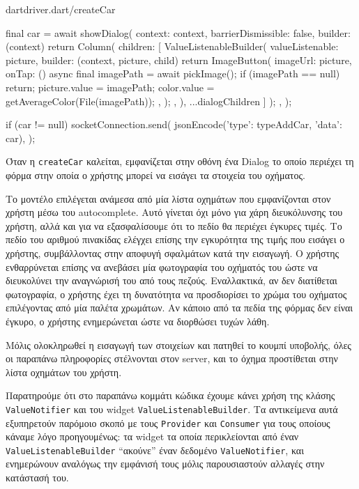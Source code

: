 \documentclass[../thesis.tex]{subfiles}
\begin{document}
\begin{codeblock}{dart}{driver.dart/createCar}
{    final car = await showDialog(
      context: context,
      barrierDismissible: false,
      builder: (context) {
        return Column(
          children: [
            ValueListenableBuilder(
              valueListenable: picture,
              builder: (context, picture, child) {
                return ImageButton(
                  imageUrl: picture,
                  onTap: () async {
                    final imagePath = await pickImage();
                    if (imagePath == null) return;
                    picture.value = imagePath;
                    color.value = getAverageColor(File(imagePath));
                  },
                );
              },
            ),
          ...dialogChildren
          ]
        );
      },
    );

    if (car != null) {
      socketConnection.send(
        jsonEncode({'type': typeAddCar, 'data': car}),
      );
    }
  }
\end{codeblock}

Όταν η \texttt{createCar} καλείται, εμφανίζεται στην οθόνη ένα Dialog το οποίο περιέχει τη φόρμα στην οποία ο χρήστης μπορεί να εισάγει τα στοιχεία του οχήματος.

\bigskip

Το μοντέλο επιλέγεται ανάμεσα από μία λίστα οχημάτων που εμφανίζονται στον χρήστη μέσω του autocomplete.
Αυτό γίνεται όχι μόνο για χάρη διευκόλυνσης του χρήστη, αλλά και για να εξασφαλίσουμε ότι το πεδίο θα περιέχει έγκυρες τιμές.
Το πεδίο του αριθμού πινακίδας ελέγχει επίσης την εγκυρότητα της τιμής που εισάγει ο χρήστης, συμβάλλοντας στην αποφυγή σφαλμάτων κατά την εισαγωγή.
Ο χρήστης ενθαρρύνεται επίσης να ανεβάσει μία φωτογραφία του οχήματός του ώστε να διευκολύνει την αναγνώρισή του από τους πεζούς.
Εναλλακτικά, αν δεν διατίθεται φωτογραφία, ο χρήστης έχει τη δυνατότητα να προσδιορίσει το χρώμα του οχήματος επιλέγοντας από μία παλέτα χρωμάτων.
Αν κάποιο από τα πεδία της φόρμας δεν είναι έγκυρο, ο χρήστης ενημερώνεται ώστε να διορθώσει τυχών λάθη.

Μόλις ολοκληρωθεί η εισαγωγή των στοιχείων και πατηθεί το κουμπί υποβολής, όλες οι παραπάνω πληροφορίες στέλνονται στον server, και το όχημα προστίθεται στην λίστα οχημάτων του χρήστη.

\bigskip

Παρατηρούμε ότι στο παραπάνω κομμάτι κώδικα έχουμε κάνει χρήση της κλάσης \texttt{Value\-Notifier} και του widget \texttt{Value\-Listenable\-Builder}.
Τα αντικείμενα αυτά εξυπηρετούν παρόμοιο σκοπό με τους \texttt{Provider} και \texttt{Consumer} για τους οποίους κάναμε λόγο προηγουμένως: τα widget τα οποία περικλείονται από έναν \texttt{Value\-Listenable\-Builder} ``ακούνε'' έναν δεδομένο \texttt{Value\-Notifier}, και ενημερώνουν αναλόγως την εμφάνισή τους μόλις παρουσιαστούν αλλαγές στην κατάστασή του.
\end{document}
